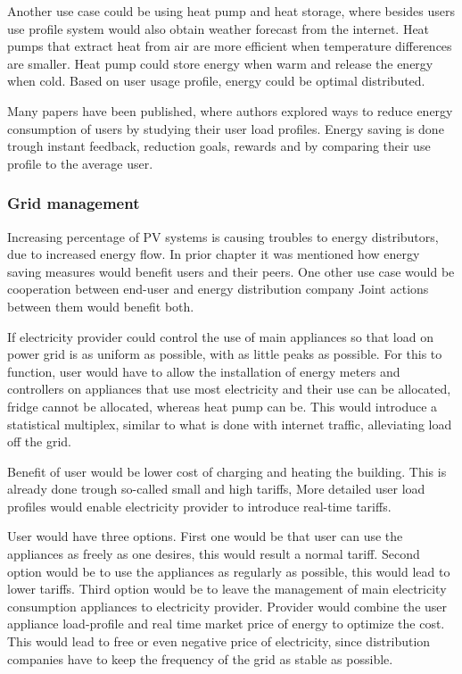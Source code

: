 \documentclass[
11pt, %
english, %
singlespacing, %
headsepline, %
]{MastersDoctoralThesis} %
\begin{document}
Another use case could be using heat pump and heat storage,
where besides users use profile system would also obtain weather forecast from the internet.
Heat pumps that extract heat from air are more efficient when temperature differences are smaller. 
Heat pump could store energy when warm and release the energy when cold.
Based on user usage profile, energy could be optimal distributed.

Many papers have been published, where authors explored ways to reduce energy consumption of users by studying their user load profiles.
Energy saving is done trough instant feedback, reduction goals, rewards and by comparing their use profile to the average user.

\subsubsection{Grid management}

Increasing percentage of PV systems is causing troubles to energy distributors, 
due to increased energy flow. In prior chapter it was mentioned how energy saving measures would benefit users and their peers.
One other use case would be cooperation between end-user and energy distribution company
Joint actions between them would benefit both.

If electricity provider could control the use of main appliances so that load on power grid is as uniform as possible,
with as little peaks as possible. For this to function, user would have to allow the installation of energy meters and controllers 
on appliances that use most electricity and their use can be allocated, fridge cannot be allocated, whereas heat pump can be.
This would introduce a statistical multiplex, similar to what is done with internet traffic, alleviating load off the grid. 

Benefit of user would be lower cost of charging and heating the building.
This is already done trough so-called small and high tariffs,
More detailed user load profiles would enable electricity provider to introduce real-time tariffs.

User would have three options. First one would be that user can use the appliances as freely as one desires, this would result a normal tariff.
Second option would be to use the appliances as regularly as possible, this would lead to lower tariffs.
Third option would be to leave the management of main electricity consumption appliances to electricity provider. Provider would combine the
user appliance load-profile and real time market price of energy to optimize the cost. 
This would lead to free or even negative price of electricity, since distribution companies have to keep the frequency of the grid as stable as possible.
\end{document}
